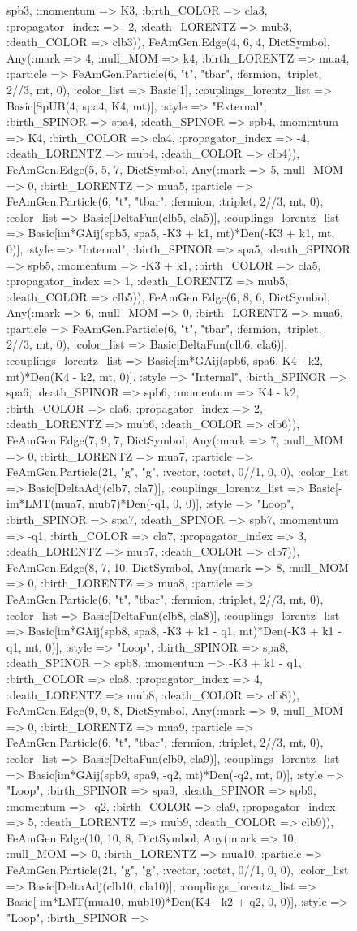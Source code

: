 \documentclass{revtex4}
\begin{document}
\begin{figure}[!htb]
\begin{center}
{spb3, :momentum => K3, :birth_COLOR => cla3, :propagator_index => -2, :death_LORENTZ => mub3, :death_COLOR => clb3)), FeAmGen.Edge(4, 6, 4, Dict{Symbol, Any}(:mark => 4, :null_MOM => k4, :birth_LORENTZ => mua4, :particle => FeAmGen.Particle(6, "t", "tbar", :fermion, :triplet, 2//3, mt, 0), :color_list => Basic[1], :couplings_lorentz_list => Basic[SpUB(4, spa4, K4, mt)], :style => "External", :birth_SPINOR => spa4, :death_SPINOR => spb4, :momentum => K4, :birth_COLOR => cla4, :propagator_index => -4, :death_LORENTZ => mub4, :death_COLOR => clb4)), FeAmGen.Edge(5, 5, 7, Dict{Symbol, Any}(:mark => 5, :null_MOM => 0, :birth_LORENTZ => mua5, :particle => FeAmGen.Particle(6, "t", "tbar", :fermion, :triplet, 2//3, mt, 0), :color_list => Basic[DeltaFun(clb5, cla5)], :couplings_lorentz_list => Basic[im*GAij(spb5, spa5, -K3 + k1, mt)*Den(-K3 + k1, mt, 0)], :style => "Internal", :birth_SPINOR => spa5, :death_SPINOR => spb5, :momentum => -K3 + k1, :birth_COLOR => cla5, :propagator_index => 1, :death_LORENTZ => mub5, :death_COLOR => clb5)), FeAmGen.Edge(6, 8, 6, Dict{Symbol, Any}(:mark => 6, :null_MOM => 0, :birth_LORENTZ => mua6, :particle => FeAmGen.Particle(6, "t", "tbar", :fermion, :triplet, 2//3, mt, 0), :color_list => Basic[DeltaFun(clb6, cla6)], :couplings_lorentz_list => Basic[im*GAij(spb6, spa6, K4 - k2, mt)*Den(K4 - k2, mt, 0)], :style => "Internal", :birth_SPINOR => spa6, :death_SPINOR => spb6, :momentum => K4 - k2, :birth_COLOR => cla6, :propagator_index => 2, :death_LORENTZ => mub6, :death_COLOR => clb6)), FeAmGen.Edge(7, 9, 7, Dict{Symbol, Any}(:mark => 7, :null_MOM => 0, :birth_LORENTZ => mua7, :particle => FeAmGen.Particle(21, "g", "g", :vector, :octet, 0//1, 0, 0), :color_list => Basic[DeltaAdj(clb7, cla7)], :couplings_lorentz_list => Basic[-im*LMT(mua7, mub7)*Den(-q1, 0, 0)], :style => "Loop", :birth_SPINOR => spa7, :death_SPINOR => spb7, :momentum => -q1, :birth_COLOR => cla7, :propagator_index => 3, :death_LORENTZ => mub7, :death_COLOR => clb7)), FeAmGen.Edge(8, 7, 10, Dict{Symbol, Any}(:mark => 8, :null_MOM => 0, :birth_LORENTZ => mua8, :particle => FeAmGen.Particle(6, "t", "tbar", :fermion, :triplet, 2//3, mt, 0), :color_list => Basic[DeltaFun(clb8, cla8)], :couplings_lorentz_list => Basic[im*GAij(spb8, spa8, -K3 + k1 - q1, mt)*Den(-K3 + k1 - q1, mt, 0)], :style => "Loop", :birth_SPINOR => spa8, :death_SPINOR => spb8, :momentum => -K3 + k1 - q1, :birth_COLOR => cla8, :propagator_index => 4, :death_LORENTZ => mub8, :death_COLOR => clb8)), FeAmGen.Edge(9, 9, 8, Dict{Symbol, Any}(:mark => 9, :null_MOM => 0, :birth_LORENTZ => mua9, :particle => FeAmGen.Particle(6, "t", "tbar", :fermion, :triplet, 2//3, mt, 0), :color_list => Basic[DeltaFun(clb9, cla9)], :couplings_lorentz_list => Basic[im*GAij(spb9, spa9, -q2, mt)*Den(-q2, mt, 0)], :style => "Loop", :birth_SPINOR => spa9, :death_SPINOR => spb9, :momentum => -q2, :birth_COLOR => cla9, :propagator_index => 5, :death_LORENTZ => mub9, :death_COLOR => clb9)), FeAmGen.Edge(10, 10, 8, Dict{Symbol, Any}(:mark => 10, :null_MOM => 0, :birth_LORENTZ => mua10, :particle => FeAmGen.Particle(21, "g", "g", :vector, :octet, 0//1, 0, 0), :color_list => Basic[DeltaAdj(clb10, cla10)], :couplings_lorentz_list => Basic[-im*LMT(mua10, mub10)*Den(K4 - k2 + q2, 0, 0)], :style => "Loop", :birth_SPINOR => }
\end{center}
\end{figure}
\end{document}
